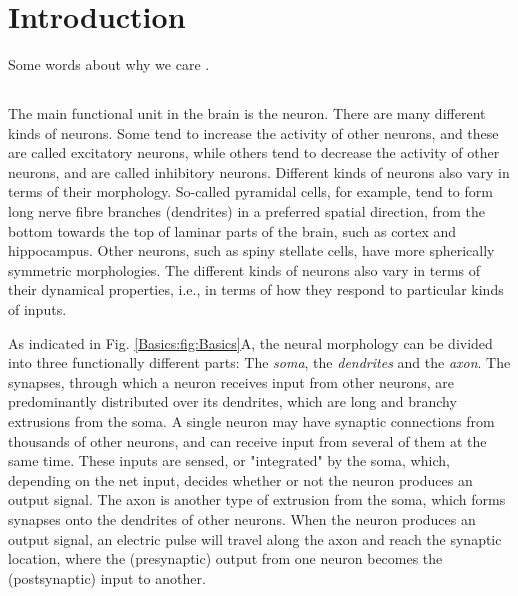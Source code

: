 \section{Introduction} 
\label{sec:Intro}

Some words about why we care \citep{Buzsaki2012,Pettersen2012,Einevoll2013,Einevoll2013a,Einevoll2019}.


\subsection{}
The main functional unit in the brain is the neuron. There are many different kinds of neurons. Some tend to increase the activity of other neurons, and these are called excitatory neurons, while others tend to decrease the activity of other neurons, and are called inhibitory neurons. Different kinds of neurons also vary in terms of their morphology. So-called pyramidal cells, for example, tend to form long nerve fibre branches (dendrites) in a preferred spatial direction, from the bottom towards the top of laminar parts of the brain, such as cortex and hippocampus. Other neurons, such as spiny stellate cells, have more spherically symmetric morphologies. The different kinds of neurons also vary in terms of their dynamical properties, i.e., in terms of how they respond to particular kinds of inputs.

As indicated in Fig. \ref{Basics:fig:Basics}A, the neural morphology can be divided into three functionally different parts: The \textit{soma}, the \textit{dendrites} and the \textit{axon}. The synapses, through which a neuron receives input from other neurons, are predominantly distributed over its dendrites, which are long and branchy extrusions from the soma. A single neuron may have synaptic connections from thousands of other neurons, and can receive input from several of them at the same time. These inputs are sensed, or "integrated" by the soma, which, depending on the net input, decides whether or not the neuron produces an output signal. The axon is another type of extrusion from the soma, which forms synapses onto the dendrites of other neurons. When the neuron produces an output signal, an electric pulse will travel along the axon and reach the synaptic location, where the (presynaptic) output from one neuron becomes the (postsynaptic) input to another. 

